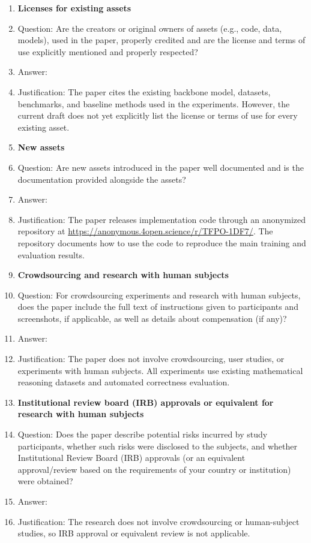 \begin{enumerate}
\item {\bf Licenses for existing assets}
    \item[] Question: Are the creators or original owners of assets (e.g., code, data, models), used in the paper, properly credited and are the license and terms of use explicitly mentioned and properly respected?
    \item[] Answer: \answerNo{}
    \item[] Justification: The paper cites the existing backbone model, datasets, benchmarks, and baseline methods used in the experiments. However, the current draft does not yet explicitly list the license or terms of use for every existing asset.

\item {\bf New assets}
    \item[] Question: Are new assets introduced in the paper well documented and is the documentation provided alongside the assets?
    \item[] Answer: \answerYes{}
    \item[] Justification: The paper releases implementation code through an anonymized repository at \url{https://anonymous.4open.science/r/TFPO-1DF7/}. The repository documents how to use the code to reproduce the main training and evaluation results.

\item {\bf Crowdsourcing and research with human subjects}
    \item[] Question: For crowdsourcing experiments and research with human subjects, does the paper include the full text of instructions given to participants and screenshots, if applicable, as well as details about compensation (if any)?
    \item[] Answer: \answerNA{}
    \item[] Justification: The paper does not involve crowdsourcing, user studies, or experiments with human subjects. All experiments use existing mathematical reasoning datasets and automated correctness evaluation.

\item {\bf Institutional review board (IRB) approvals or equivalent for research with human subjects}
    \item[] Question: Does the paper describe potential risks incurred by study participants, whether such risks were disclosed to the subjects, and whether Institutional Review Board (IRB) approvals (or an equivalent approval/review based on the requirements of your country or institution) were obtained?
    \item[] Answer: \answerNA{}
    \item[] Justification: The research does not involve crowdsourcing or human-subject studies, so IRB approval or equivalent review is not applicable.


\end{enumerate}
